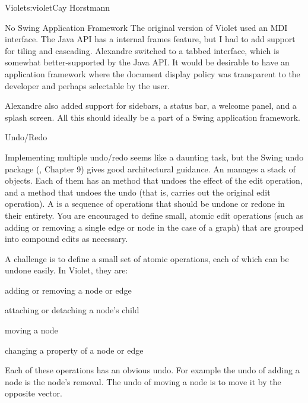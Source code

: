 \begin{aosachapter}{Violet}{s:violet}{Cay Horstmann}
\begin{aosasect1}{No Swing Application Framework}
The original version of Violet used an MDI interface. The Java API has
a internal frames feature, but I had to add support for tiling and
cascading.  Alexandre switched to a tabbed interface, which is
somewhat better-supported by the Java API\@. It would be desirable to
have an application framework where the document display policy was
transparent to the developer and perhaps selectable by the user.

Alexandre also added support for sidebars, a status bar, a welcome
panel, and a splash screen. All this should ideally be a part of a
Swing application framework.

\end{aosasect1}

\begin{aosasect1}{Undo/Redo}

Implementing multiple undo/redo seems like a daunting task, but the
Swing undo package (\cite{bib:topley:coreswing}, Chapter 9) gives good
architectural guidance. An  manages a stack of
 objects. Each of them has an  method
that undoes the effect of the edit operation, and a  method
that undoes the undo (that is, carries out the original edit
operation). A  is a sequence of 
operations that should be undone or redone in their entirety. You are
encouraged to define small, atomic edit operations (such as adding or
removing a single edge or node in the case of a graph) that are
grouped into compound edits as necessary.

A challenge is to define a small set of atomic operations, each of
which can be undone easily. In Violet, they are:

\begin{aosaitemize}

  \item adding or removing a node or edge

  \item attaching or detaching a node's child

  \item moving a node

  \item changing a property of a node or edge

\end{aosaitemize}

Each of these operations has an obvious undo. For example the undo of
adding a node is the node's removal. The undo of moving a node is to
move it by the opposite vector.


\end{aosasect1}
\end{aosachapter}
